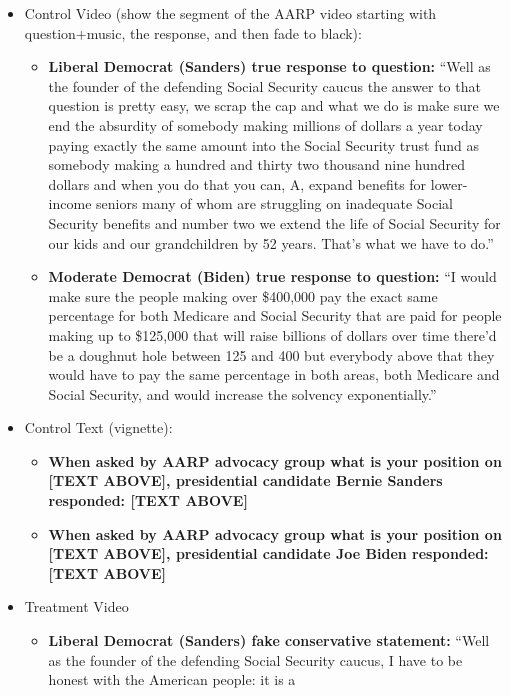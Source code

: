 \begin{itemize}
\item Control Video (show the segment of the AARP video starting with
  question+music, the response, and then fade to black):
  \begin{itemize}
  \item \textbf{Liberal Democrat (Sanders) true response to question:}
    ``Well as the founder of the defending Social Security caucus the
    answer to that question is pretty easy, we scrap the cap and what
    we do is make sure we end the absurdity of somebody making
    millions of dollars a year today paying exactly the same amount
    into the Social Security trust fund as somebody making a hundred
    and thirty two thousand nine hundred dollars and when you do that
    you can, A, expand benefits for lower-income seniors many of whom
    are struggling on inadequate Social Security benefits and number
    two we extend the life of Social Security for our kids and our
    grandchildren by 52 years. That's what we have to do.''
  \item \textbf{Moderate Democrat (Biden) true response to question:}
    ``I would make sure the people making over \$400,000 pay the exact
    same percentage for both Medicare and Social Security that are
    paid for people making up to \$125,000 that will raise billions of
    dollars over time there'd be a doughnut hole between 125 and 400
    but everybody above that they would have to pay the same
    percentage in both areas, both Medicare and Social Security, and
    would increase the solvency exponentially.''
  \end{itemize}
\item Control Text (vignette):
  \begin{itemize}
  \item \textbf{When asked by AARP advocacy group what is your position on [TEXT ABOVE], presidential candidate Bernie Sanders responded: [TEXT ABOVE]}
  \item \textbf{When asked by AARP advocacy group what is your position on [TEXT ABOVE], presidential candidate Joe Biden responded: [TEXT ABOVE]}
  \end{itemize}
\item Treatment Video
  \begin{itemize}
  \item \textbf{Liberal Democrat (Sanders) fake conservative
    statement:} ``Well as the founder of the defending Social Security
    caucus, I have to be honest with the American people: it is a

\end{itemize}
\end{itemize}
